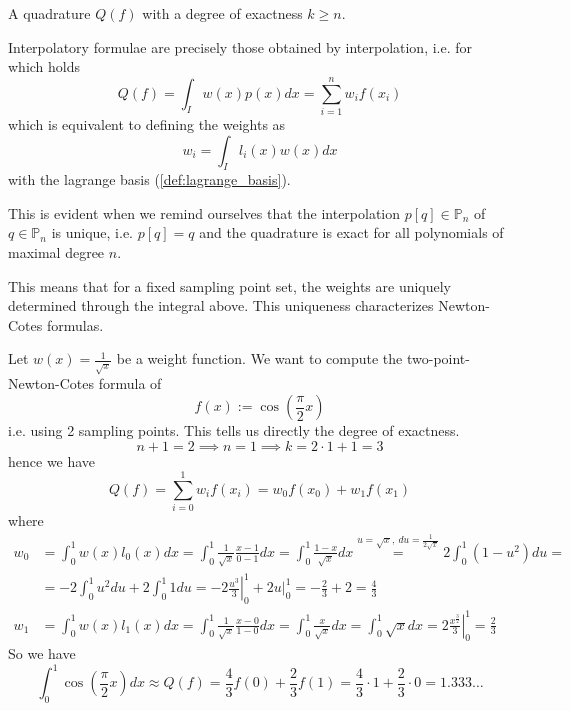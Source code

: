\begin{definition}
   A quadrature \(Q(f)\) with a degree of exactness \(k \geq n\).
\end{definition}
\begin{remark}
   Interpolatory formulae are precisely those obtained by interpolation, i.e. for which holds
   \[Q(f) = \int_I w(x) p(x)dx = \sum_{i=1}^n w_i f(x_i)\]
   which is equivalent to defining the weights as
   \[w_i = \int_I l_i(x) w(x)dx\]
   with the lagrange basis (\ref{def:lagrange_basis}).

   This is evident when we remind ourselves that the interpolation \(p[q] \in \mathbb{P}_n\) of \(q \in \mathbb{P}_n\) is unique, i.e. \(p[q] = q\) and the quadrature is exact for all polynomials of maximal degree \(n\).

   This means that for a fixed sampling point set, the weights are uniquely determined through the integral above.
   This uniqueness characterizes Newton-Cotes formulas.
\end{remark}

\begin{example}
   Let \(w(x) = \frac{1}{\sqrt{x}}\) be a weight function.
   We want to compute the two-point-Newton-Cotes formula of
   \[f(x) := \cos\left(\frac{\pi}{2} x\right)\]
   i.e. using 2 sampling points.
   This tells us directly the degree of exactness.
   \[n+1 = 2 \implies n = 1 \implies k = 2 \cdot 1 + 1 = 3\]
   hence we have
   \[Q(f) = \sum_{i=0}^1 w_i f(x_i) = w_0f(x_0) + w_1f(x_1)\]
   where
   \begin{equation*}
      \begin{split}
         w_0 & = \int_0^1 w(x)l_0(x) dx = \int_0^1 \frac{1}{\sqrt{x}} \frac{x - 1}{0 - 1} dx = \int_0^1 \frac{1 - x}{\sqrt{x}} dx \overset{u = \sqrt{x},~du = \frac{1}{2\sqrt{x}}}{=} 2 \int_0^1 (1 - u^2) du =\\
             & = -2 \int_0^1 u^2 du + 2 \int_0^1 1 du = \left.-2\frac{u^3}{3}\right\rvert_0^1 + 2u\rvert_0^1 = -\frac{2}{3} + 2 = \frac{4}{3}\\
         w_1 & = \int_0^1 w(x)l_1(x) dx = \int_0^1 \frac{1}{\sqrt{x}} \frac{x - 0}{1 - 0} dx = \int_0^1 \frac{x}{\sqrt{x}} dx = \int_0^1 \sqrt{x} dx = \left.2\frac{x^\frac{3}{2}}{3}\right\rvert_0^1 = \frac{2}{3}
      \end{split}
   \end{equation*}
   So we have
   \[\int_0^1 \cos\left(\frac{\pi}{2}x\right) dx \approx Q(f) = \frac{4}{3}f(0) + \frac{2}{3}f(1) = \frac{4}{3} \cdot 1 + \frac{2}{3} \cdot 0 = 1.333\ldots\]
\end{example}

